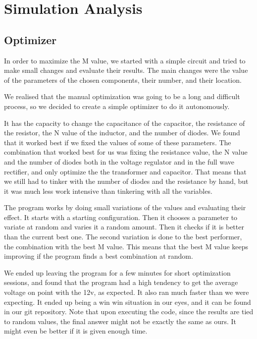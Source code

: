 \section{Simulation Analysis}
\label{sec:simulation analysis}
\subsection{Optimizer}
In order to maximize the M value, we started with a simple  circuit and tried to make small changes and evaluate their results. The main changes were the value of the parameters of the chosen components, their number, and their location.

We realised that the manual optimization was going to be a long and difficult process, so we decided to create a simple optimizer to do it autonomously.

It has the capacity to change the capacitance of the capacitor, the resistance of the resistor, the N value of the inductor, and the number of diodes. We found that it worked best if we fixed the values of some of these parameters. The combination that worked best for us was fixing the resistance value, the N value and the number of diodes both in the voltage regulator and in the full wave rectifier, and only optimize the the transformer and capacitor.  That means that we still had to tinker with the number of diodes and the resistance by hand, but it was much less work intensive than tinkering with all the variables.

The program works by doing small variations of the values and evaluating their effect. It starts with a starting configuration. Then it chooses a parameter to variate at random and varies it a random amount. Then it checks if it is better than the current best one. The second variation is done to the best performer, the combination with the best M value. This means that the best M value keeps improving if the program finds a best combination at random.

We ended up leaving the program for a few minutes for short optimization sessions, and found that the program had a high tendency to get the average voltage on point with the 12v, as expected. It also ran much faster than we were expecting. It ended up being a win win situation in our eyes, and it can be found in our git repository. Note that upon executing the code, since the results are tied to random values, the final answer might not be exactly the same as ours. It might even be better if it is given enough time.


